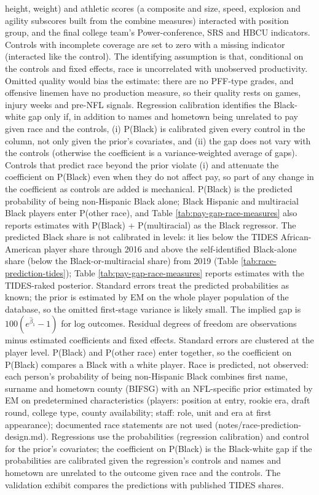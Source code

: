 \begin{table}[!h]
{\begin{threeparttable}
\begin{tablenotes}[para]
height, weight) and athletic scores (a composite and size, speed, explosion and agility subscores built from the combine measures) interacted with position group, and the final college team's Power-conference, SRS and HBCU indicators. Controls with incomplete coverage are set to zero with a missing indicator (interacted like the control). The identifying assumption is that, conditional on the controls and fixed effects, race is uncorrelated with unobserved productivity. Omitted quality would bias the estimate: there are no PFF-type grades, and offensive linemen have no production measure, so their quality rests on games, injury weeks and pre-NFL signals. Regression calibration identifies the Black-white gap only if, in addition to names and hometown being unrelated to pay given race and the controls, (i) P(Black) is calibrated given every control in the column, not only given the prior's covariates, and (ii) the gap does not vary with the controls (otherwise the coefficient is a variance-weighted average of gaps). Controls that predict race beyond the prior violate (i) and attenuate the coefficient on P(Black) even when they do not affect pay, so part of any change in the coefficient as controls are added is mechanical. P(Black) is the predicted probability of being non-Hispanic Black alone; Black Hispanic and multiracial Black players enter P(other race), and Table \ref{tab:pay-gap-race-measures} also reports estimates with P(Black) + P(multiracial) as the Black regressor. The predicted Black share is not calibrated in levels: it lies below the TIDES African-American player share through 2016 and above the self-identified Black-alone share (below the Black-or-multiracial share) from 2019 (Table \ref{tab:race-prediction-tides}); Table \ref{tab:pay-gap-race-measures} reports estimates with the TIDES-raked posterior. Standard errors treat the predicted probabilities as known; the prior is estimated by EM on the whole player population of the database, so the omitted first-stage variance is likely small. The implied gap is $100(e^{\hat\beta_1}-1)$ for log outcomes. Residual degrees of freedom are observations minus estimated coefficients and fixed effects. Standard errors are clustered at the player level. P(Black) and P(other race) enter together, so the coefficient on P(Black) compares a Black with a white player. Race is predicted, not observed: each person's probability of being non-Hispanic Black combines first name, surname and hometown county (BIFSG) with an NFL-specific prior estimated by EM on predetermined characteristics (players: position at entry, rookie era, draft round, college type, county availability; staff: role, unit and era at first appearance); documented race statements are not used (notes/race-prediction-design.md). Regressions use the probabilities (regression calibration) and control for the prior's covariates; the coefficient on P(Black) is the Black-white gap if the probabilities are calibrated given the regression's controls and names and hometown are unrelated to the outcome given race and the controls. The validation exhibit compares the predictions with published TIDES shares.

\end{tablenotes}
\end{threeparttable}}
\end{table}

